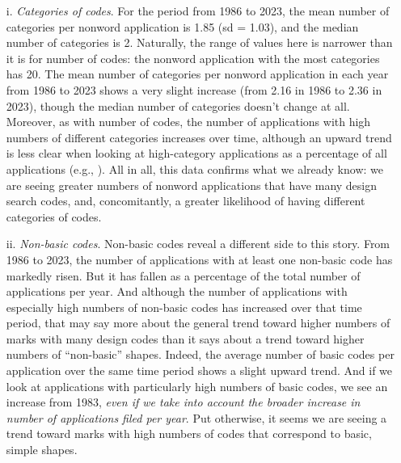 \documentclass[letterpaper, 11pt, oneside]{article}
\begin{document}
\begin{enumerate}

\item[i.] \textit{Categories of codes}. For the period from 1986 to 2023, the mean number of categories per nonword application is 1.85 (sd = 1.03), and the median number of categories is 2. Naturally, the range of values here is narrower than it is for number of codes: the nonword application with the most categories has 20. The mean number of categories per nonword application in each year from 1986 to 2023 shows a very slight increase (from 2.16 in 1986 to 2.36 in 2023), though the median number of categories doesn't change at all. Moreover, as with number of codes, the number of applications with high numbers of different categories increases over time, although an upward trend is less clear when looking at high-category applications as a percentage of all applications (e.g., ). All in all, this data confirms what we already know: we are seeing greater numbers of nonword applications that have many design search codes, and, concomitantly, a greater likelihood of having different categories of codes.

\item[ii.] \textit{Non-basic codes}. Non-basic codes reveal a different side to this story. From 1986 to 2023, the number of applications with at least one non-basic code has markedly risen. But it has fallen as a percentage of the total number of applications per year. And although the number of applications with especially high numbers of non-basic codes has increased over that time period, that may say more about the general trend toward higher numbers of marks with many design codes than it says about a trend toward higher numbers of ``non-basic'' shapes. Indeed, the average number of basic codes per application over the same time period shows a slight upward trend. And if we look at applications with particularly high numbers of basic codes, we see an increase from 1983, \emph{even if we take into account the broader increase in number of applications filed per year}. Put otherwise, it seems we are seeing a trend toward marks with high numbers of codes that correspond to basic, simple shapes.


\end{enumerate}
\end{document}
